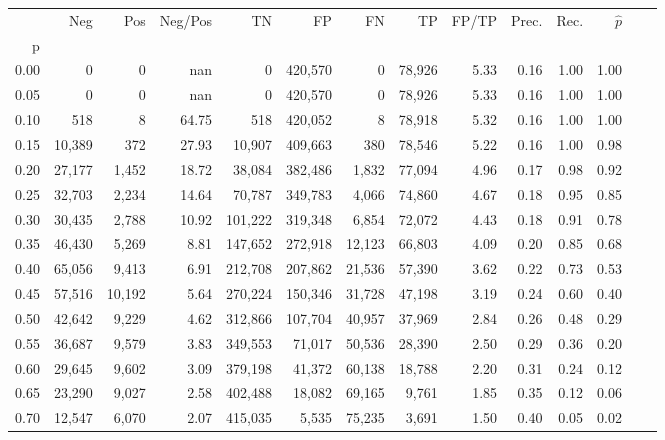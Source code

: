 \begin{tabular}{rrrrrrrrrrrrrr}
\toprule
{} &     Neg &     Pos & Neg/Pos &       TN &       FP &      FN &      TP & FP/TP & Prec. &  Rec. & $\hat{p}$ \\
p    &         &         &         &          &          &         &         &       &       &       &           \\
\midrule
0.00 &       0 &       0 &     nan &        0 &  420,570 &       0 &  78,926 &  5.33 &  0.16 &  1.00 &      1.00 \\
0.05 &       0 &       0 &     nan &        0 &  420,570 &       0 &  78,926 &  5.33 &  0.16 &  1.00 &      1.00 \\
0.10 &     518 &       8 &   64.75 &      518 &  420,052 &       8 &  78,918 &  5.32 &  0.16 &  1.00 &      1.00 \\
0.15 &  10,389 &     372 &   27.93 &   10,907 &  409,663 &     380 &  78,546 &  5.22 &  0.16 &  1.00 &      0.98 \\
0.20 &  27,177 &   1,452 &   18.72 &   38,084 &  382,486 &   1,832 &  77,094 &  4.96 &  0.17 &  0.98 &      0.92 \\
0.25 &  32,703 &   2,234 &   14.64 &   70,787 &  349,783 &   4,066 &  74,860 &  4.67 &  0.18 &  0.95 &      0.85 \\
0.30 &  30,435 &   2,788 &   10.92 &  101,222 &  319,348 &   6,854 &  72,072 &  4.43 &  0.18 &  0.91 &      0.78 \\
0.35 &  46,430 &   5,269 &    8.81 &  147,652 &  272,918 &  12,123 &  66,803 &  4.09 &  0.20 &  0.85 &      0.68 \\
0.40 &  65,056 &   9,413 &    6.91 &  212,708 &  207,862 &  21,536 &  57,390 &  3.62 &  0.22 &  0.73 &      0.53 \\
0.45 &  57,516 &  10,192 &    5.64 &  270,224 &  150,346 &  31,728 &  47,198 &  3.19 &  0.24 &  0.60 &      0.40 \\
0.50 &  42,642 &   9,229 &    4.62 &  312,866 &  107,704 &  40,957 &  37,969 &  2.84 &  0.26 &  0.48 &      0.29 \\
0.55 &  36,687 &   9,579 &    3.83 &  349,553 &   71,017 &  50,536 &  28,390 &  2.50 &  0.29 &  0.36 &      0.20 \\
0.60 &  29,645 &   9,602 &    3.09 &  379,198 &   41,372 &  60,138 &  18,788 &  2.20 &  0.31 &  0.24 &      0.12 \\
0.65 &  23,290 &   9,027 &    2.58 &  402,488 &   18,082 &  69,165 &   9,761 &  1.85 &  0.35 &  0.12 &      0.06 \\
0.70 &  12,547 &   6,070 &    2.07 &  415,035 &    5,535 &  75,235 &   3,691 &  1.50 &  0.40 &  0.05 &      0.02 \\

\end{tabular}
